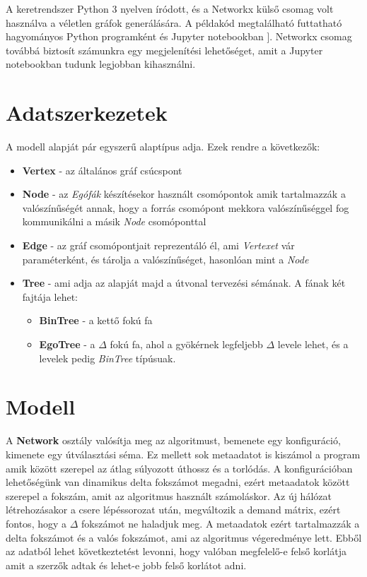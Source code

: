 \documentclass[12pt]{report}
\begin{document}
A keretrendszer Python 3 nyelven íródott, és a Networkx külső csomag volt használva a véletlen gráfok generálására.
A példakód megtalálható futtatható hagyományos Python programként és Jupyter notebookban \cite{noauthor_jupyter_nodate}].  
Networkx csomag továbbá biztosít számunkra egy megjelenítési lehetőséget, amit a Jupyter notebookban tudunk legjobban kihasználni.



\section{Adatszerkezetek}

A modell alapját pár egyszerű alaptípus adja. Ezek rendre a következők:
\begin{itemize}
	\item \textbf{Vertex} - az általános gráf csúcspont
	\item \textbf{Node} - az \textit{Egófák} készítésekor használt csomópontok amik tartalmazzák a valószínűségét annak, hogy a forrás csomópont mekkora valószínűséggel fog kommunikálni a másik \textit{Node} csomóponttal
	\item \textbf{Edge} - az gráf csomópontjait reprezentáló él, ami \textit{Vertexet} vár paraméterként, és tárolja a valószínűséget, hasonlóan mint a \textit{Node}
	\item \textbf{Tree} - ami adja az alapját majd a útvonal tervezési sémának. A fának két fajtája lehet:
	\begin{itemize}
		\item \textbf{BinTree} - a kettő fokú fa
		\item \textbf{EgoTree} - a $\Delta$ fokú fa, ahol a gyökérnek legfeljebb $\Delta$ levele lehet, és a levelek pedig \textit{BinTree} típúsuak.
	\end{itemize}
	
\end{itemize}
	
\section{Modell}

A \textbf{Network} osztály valósítja meg az algoritmust, bemenete egy konfiguráció, kimenete egy útválasztási séma.
Ez mellett sok metaadatot is kiszámol a program amik között szerepel az átlag súlyozott úthossz és a torlódás.
A konfigurációban lehetőségünk van dinamikus delta fokszámot megadni, ezért metaadatok között szerepel a fokszám, amit az algoritmus használt számoláskor.
Az új hálózat létrehozásakor a csere lépéssorozat után, megváltozik a demand mátrix, ezért fontos, hogy a \(\Delta\) fokszámot ne haladjuk meg.
A metaadatok ezért tartalmazzák a delta fokszámot és a valós fokszámot, ami az algoritmus végeredménye lett.  
Ebből az adatból lehet következtetést levonni, hogy valóban megfelelő-e felső korlátja amit a szerzők adtak és lehet-e jobb felső korlátot adni. 
\end{document}
